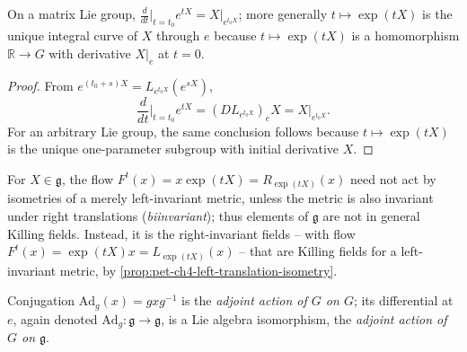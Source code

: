 \begin{proposition}
  \label{prop:pet-ch4-matrix-exp-integral-curve}
  \leanok
  On a matrix Lie group, $\tfrac{d}{dt}\big|_{t=t_0}e^{tX}=X|_{e^{t_0X}}$; more
  generally $t\mapsto\exp(tX)$ is the unique integral curve of $X$ through $e$
  because $t\mapsto\exp(tX)$ is a homomorphism $\mathbb{R}\to G$ with derivative
  $X|_e$ at $t=0$.
\end{proposition}
\begin{proof}
  \leanok
  \sketch
  From $e^{(t_0+s)X}=L_{e^{t_0X}}(e^{sX})$,
  \[
    \frac d{dt}\Big|_{t=t_0}e^{tX}
    =(DL_{e^{t_0X}})_eX=X|_{e^{t_0X}}.
  \]
  For an arbitrary Lie group, the same conclusion follows because
  $t\mapsto\exp(tX)$ is the unique one-parameter subgroup with initial
  derivative $X$.
\end{proof}

\begin{remark}
  \label{rem:pet-ch4-flow-right-invariant-killing}
  For $X\in\mathfrak g$, the flow $F^t(x)=x\exp(tX)=R_{\exp(tX)}(x)$ need not
  act by isometries of a merely left-invariant metric, unless the metric is
  also invariant under right translations (\emph{biinvariant}); thus elements
  of $\mathfrak g$ are not in general Killing fields. Instead, it is the
  right-invariant fields -- with flow
  $F^t(x)=\exp(tX)x=L_{\exp(tX)}(x)$ -- that are Killing fields for a
  left-invariant metric, by \cref{prop:pet-ch4-left-translation-isometry}.
\end{remark}

\begin{definition}
  \label{def:pet-ch4-adjoint-action}
  \leanok
  Conjugation $\mathrm{Ad}_g(x)=gxg^{-1}$ is the \emph{adjoint action of $G$ on
  $G$}; its differential at $e$, again denoted $\mathrm{Ad}_g:\mathfrak g\to\mathfrak g$,
  is a Lie algebra isomorphism, the \emph{adjoint action of $G$ on $\mathfrak g$}.
\end{definition}

